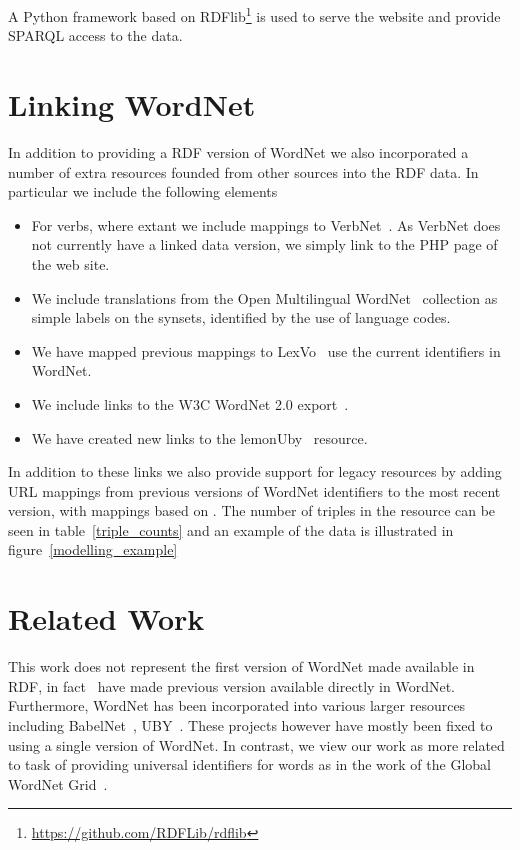 \documentclass[10pt, a4paper]{article}
\begin{document}
A Python framework based on RDFlib\footnote{\url{https://github.com/RDFLib/rdflib}} is used to serve the website and
provide SPARQL access to the data.

\section{Linking WordNet}

In addition to providing a RDF version of WordNet we also incorporated a number
of extra resources founded from other sources into the RDF data. In particular
we include the following elements

\begin{itemize}
  \item For verbs, where extant we include mappings to VerbNet~\cite{schuler2005verbnet}. As
    VerbNet does not currently have a linked data version, we simply link to the
    PHP page of the web site.
  \item We include translations from the Open Multilingual WordNet~\cite{bond2013linking}
    collection as simple labels on the synsets, identified by the use of
    language codes.
  \item We have mapped previous mappings to LexVo~\cite{de2008language} 
    use the current identifiers in WordNet.
  \item We include links to the W3C WordNet 2.0 export~\cite{van2006conversion}.
  \item We have created new links to the lemonUby~\cite{eckle2014lemonuby} resource.
\end{itemize}

In addition to these links we also provide support for legacy resources by
adding URL mappings from previous versions of WordNet identifiers to the most
recent version, with mappings based on \cite{daude2000mapping}. The number of
triples in the resource can be seen in table~\ref{triple_counts} and an example
of the data is illustrated in figure~\ref{modelling_example}

\section{Related Work}

This work does not represent the first version of WordNet made available in RDF,
in fact~\cite{van2006conversion,mccrae2012integrating} have made previous
version available directly in WordNet. Furthermore, WordNet has been
incorporated into various larger resources including
BabelNet~\cite{navigli2010babelnet,ehrmann2014},
UBY~\cite{gurevych2012uby,eckle2014lemonuby}. These projects however have mostly
been fixed to using a single version of WordNet. In contrast, we view our work
as more related to task of providing universal identifiers for words as in the
work of the Global WordNet Grid~\cite{pease2008building}.  
\end{document}
